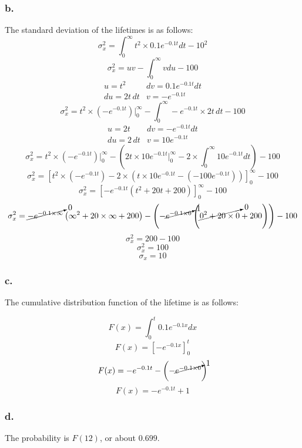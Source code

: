 \documentclass[11pt]{article}
\begin{document}
\subsubsection{b.}
The standard deviation of the lifetimes is as follows:
\[ \sigma^2_x = \int_0^{\infty}{t^2 \times 0.1e^{-0.1t}}dt - 10^2 \]
\[ \sigma^2_x = uv - \int_{0}^{\infty} v du - 100 \]
\[
    \begin{array}{ll}
        u = t^2 & dv = 0.1e^{-0.1t} dt \\
        du = 2t\, dt & v = -e^{-0.1t}
    \end{array} 
\]
\[ \sigma^2_x = t^2\times \left( -e^{-0.1t} \right) \bigg\vert^\infty_0 -
                \int_{0}^{\infty} -e^{-0.1t} \times 2t \, dt - 100 \]
\[
    \begin{array}{ll}
        u = 2t & dv = -e^{-0.1t} dt \\
        du = 2\, dt & v = 10e^{-0.1t}
    \end{array} 
\]
\[ \sigma^2_x = t^2\times \left( -e^{-0.1t} \right) \bigg\vert^\infty_0 -
                \left( 
                    2t \times 10e^{-0.1t} \bigg\vert^\infty_0 - 
                    2 \times \int_{0}^{\infty} 10e^{-0.1t} dt
                \right) - 100\]
\[ \sigma^2_x = 
        {\left[ 
            t^2\times \left( -e^{-0.1t} \right)  -
            2 \times \left( 
                t \times 10e^{-0.1t} - 
                \left( -
                    100e^{-0.1t}
                \right)
            \right)
        \right]}^\infty_0 - 100\]
\[ \sigma^2_x = 
        {\left[ -e^{-0.1t} \left( 
            t^2  + 20t + 200
        \right)\right]}^\infty_0 - 100 \]
\[ \sigma^2_x = 
    \cancelto{0}{-e^{-0.1\times \infty}} \left( 
            \infty^2  + 20\times \infty + 200
        \right) - 
        \left(-\cancelto{1}{e^{-0.1\times 0}} \left( 
        \cancelto{0}{0^2  + 20\times 0} + 200
        \right) \right)
    - 100 \]
\[ \sigma^2_x = 200 - 100 \]
\[ \sigma^2_x = 100 \]
\[ \sigma_x = 10 \]

\subsubsection{c.}
The cumulative distribution function of the lifetime is as follows:

\[ F(x) = \int_{0}^{t}0.1e^{-0.1x}dx \]
\[ F(x) = {\left[ -e^{-0.1x} \right]}^t_0 \]
\[ F(x) = -e^{-0.1t} - \left( -\cancelto{1}{e^{-0.1\times 0}} \right) \]
\[ F(x) = -e^{-0.1t} + 1 \]

\subsubsection{d.}
The probability is $F(12)$, or about $0.699$. 
\end{document}

